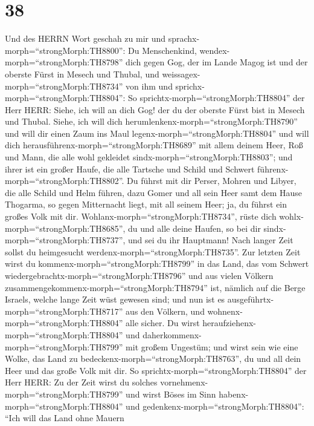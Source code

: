 \hypertarget{section-37}{%
\section{38}\label{section-37}}

 Und des HERRN Wort geschah zu mir und
sprachx-morph=``strongMorph:TH8800'':  Du Menschenkind,
wendex-morph=``strongMorph:TH8798'' dich gegen Gog, der im Lande Magog
ist und der oberste Fürst in Mesech und Thubal, und
weissagex-morph=``strongMorph:TH8734'' von ihm  und
sprichx-morph=``strongMorph:TH8804'': So
sprichtx-morph=``strongMorph:TH8804'' der Herr HERR: Siehe, ich will an
dich Gog! der du der oberste Fürst bist in Mesech und Thubal.
 Siehe, ich will dich
herumlenkenx-morph=``strongMorph:TH8790'' und will dir einen Zaum ins
Maul legenx-morph=``strongMorph:TH8804'' und will dich
herausführenx-morph=``strongMorph:TH8689'' mit allem deinem Heer, Roß
und Mann, die alle wohl gekleidet sindx-morph=``strongMorph:TH8803'';
und ihrer ist ein großer Haufe, die alle Tartsche und Schild und Schwert
führenx-morph=``strongMorph:TH8802''.  Du führst mit dir
Perser, Mohren und Libyer, die alle Schild und Helm führen, 
dazu Gomer und all sein Heer samt dem Hause Thogarma, so gegen
Mitternacht liegt, mit all seinem Heer; ja, du führst ein großes Volk
mit dir.  Wohlanx-morph=``strongMorph:TH8734'', rüste dich
wohlx-morph=``strongMorph:TH8685'', du und alle deine Haufen, so bei dir
sindx-morph=``strongMorph:TH8737'', und sei du ihr Hauptmann!
 Nach langer Zeit sollst du heimgesucht
werdenx-morph=``strongMorph:TH8735''. Zur letzten Zeit wirst du
kommenx-morph=``strongMorph:TH8799'' in das Land, das vom Schwert
wiedergebrachtx-morph=``strongMorph:TH8796'' und aus vielen Völkern
zusammengekommenx-morph=``strongMorph:TH8794'' ist, nämlich auf die
Berge Israels, welche lange Zeit wüst gewesen sind; und nun ist es
ausgeführtx-morph=``strongMorph:TH8717'' aus den Völkern, und
wohnenx-morph=``strongMorph:TH8804'' alle sicher.  Du wirst
heraufziehenx-morph=``strongMorph:TH8804'' und
daherkommenx-morph=``strongMorph:TH8799'' mit großem Ungestüm; und wirst
sein wie eine Wolke, das Land zu bedeckenx-morph=``strongMorph:TH8763'',
du und all dein Heer und das große Volk mit dir.  So
sprichtx-morph=``strongMorph:TH8804'' der Herr HERR: Zu der Zeit wirst
du solches vornehmenx-morph=``strongMorph:TH8799'' und wirst Böses im
Sinn habenx-morph=``strongMorph:TH8804''  und
gedenkenx-morph=``strongMorph:TH8804'': ``Ich will das Land ohne Mauern
